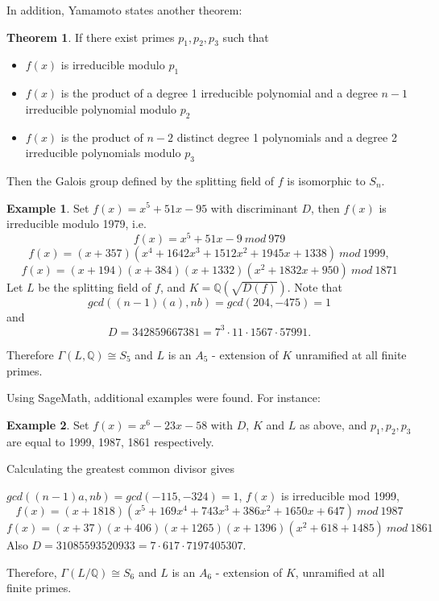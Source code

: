 \documentclass[12pt]{extarticle}
\newcommand{\Q}{\mathbb{Q}}
\newcommand{\<}{\langle}
\renewcommand{\>}{\rangle}
\theoremstyle{definition}
\newtheorem{theorem}{Theorem}
\newtheorem*{example}{Example}
\begin{document}
In addition, Yamamoto states another theorem:
\begin{theorem}
If there exist primes $p_1, p_2, p_3$ such that \begin{itemize}
\item $f(x)$ is irreducible modulo $p_1$
\item $f(x)$ is the product of a degree 1 irreducible polynomial and a degree $n-1$ irreducible polynomial modulo $p_2$
\item $f(x)$ is the product of $n-2$ distinct degree 1 polynomials and a degree 2 irreducible polynomials modulo $p_3$
\end{itemize}
Then the Galois group defined by the splitting field of $f$ is isomorphic to $S_n$.

\end{theorem}

\begin{example}
Set $f(x)= x^5+51x-95$ with discriminant $D$, then $f(x)$ is irreducible modulo 1979, i.e. 
\begin{equation}
f(x)= x^5+51x-9 \: mod  \: 979
\end{equation}
\begin{equation}
f(x)=(x + 357)(x^4 + 1642x^3 + 1512 x^2 + 1945x + 1338) \:mod\: 1999,
\end{equation}
\begin{equation}
f(x)=(
x + 194)(x + 384)(x + 1332)(x^2 + 1832x + 950)\:mod\:1871
\end{equation}
 Let $L$ be the splitting field of $f$, and $K = \Q(\sqrt{D(f)})$. 
Note that 
\begin{equation}
gcd((n-1)(a),nb) = gcd(204,-475)=1
\end{equation}
 and 
\begin{equation}
D = 342859667381 = 7^3 \cdot 11 \cdot 1567 \cdot 57991.
\end{equation} 

Therefore $\Gamma(L,\Q) \cong S_5$ and $L$ is an $A_5$ - extension of $K$ unramified at all finite primes.
\end{example}

Using SageMath, additional examples were found. For instance: 
\begin{example}
Set $f(x)= x^6-23x-58$ with $D$, $K$ and $L$ as above, and $p_1,p_2,p_3$ are equal to 1999, 1987, 1861 respectively. \par
Calculating the greatest common divisor gives 

$gcd((n-1)a,nb) = gcd(-115,-324)=1$, $f(x)$ is irreducible mod 1999,
\begin{equation}
f(x)=(x + 1818)(x^5 + 169x^4 + 743x^3+386x^2+1650x+647)\: mod \:1987
\end{equation}
\begin{equation}
f(x)=(x + 37)(x + 406)(x + 1265)(x+1396)(x^2 + 618 + 1485)\:mod\:1861
\end{equation}
 Also $D = 31085593520933 = 7 \cdot 617 \cdot 7197405307$. 

 Therefore, $\Gamma(L/\Q) \cong S_6$ and $L$ is an $A_6$ - extension of $K$, unramified at all finite primes.
\end{example}
\end{document}
